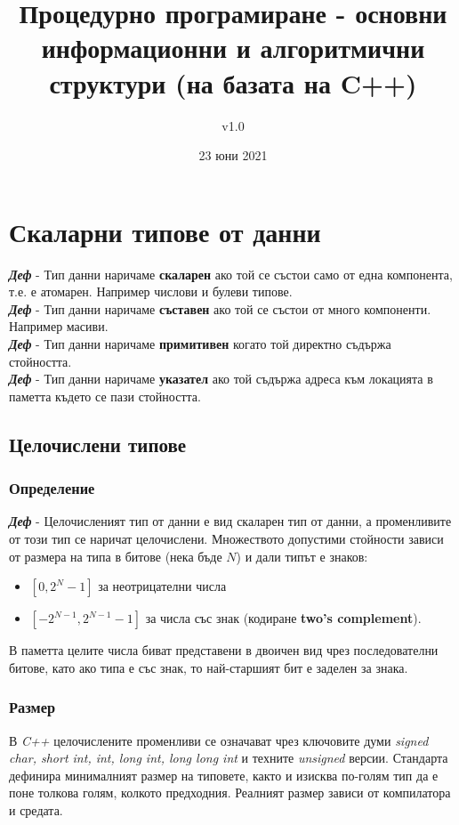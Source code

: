 \documentclass[fleqn,12pt]{article}
\title{Процедурно програмиране - основни информационни и алгоритмични структури (на базата на C++)}
\author{v1.0}
\date{23 юни 2021}
\begin{document}
\maketitle

\tableofcontents
\pagebreak

\section{Скаларни типове от данни}

\noindent \textit{\textbf{Деф}} - Тип данни наричаме \textbf{скаларен} ако той се състои само от една компонента, т.е. е атомарен. Например числови и булеви типове. \\
\noindent \textit{\textbf{Деф}} - Тип данни наричаме \textbf{съставен} ако той се състои от много компоненти. Например масиви. \\
\noindent \textit{\textbf{Деф}} - Тип данни наричаме \textbf{примитивен} когато той директно съдържа стойността. \\
\noindent \textit{\textbf{Деф}} - Тип данни наричаме \textbf{указател} ако той съдържа адреса към локацията в паметта където се пази стойността. \\

\subsection{Целочислени типове}

\subsubsection{Определение}
\noindent \textit{\textbf{Деф}} - Целочисленият тип от данни е вид скаларен тип от данни, а променливите от този тип се наричат целочислени. 
Множеството допустими стойности зависи от размера на типа в битове (нека бъде $N$) и дали типът е знаков:
\begin{itemize}
    \item $[0, 2^N - 1]$ за неотрицателни числа
    \item $[-2^{N - 1}, 2^{N - 1} - 1]$ за числа със знак (кодиране \textbf{two's complement}).
\end{itemize}

В паметта целите числа биват представени в двоичен вид чрез последователни битове, като ако типа е със знак, то най-старшият бит е заделен за знака.

\subsubsection{Размер}
В \textit{C++} целочислените променливи се означават чрез ключовите думи \textit{signed char, short int, int, long int, long long int} и техните \textit{unsigned} версии.
Стандарта дефинира минималният размер на типовете, както и изисква по-голям тип да е поне толкова голям, колкото предходния. Реалният размер зависи от компилатора и средата.
\end{document}
